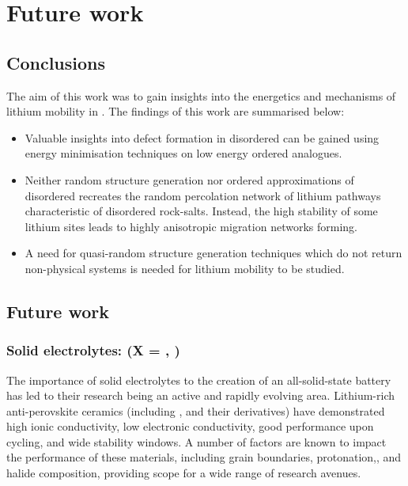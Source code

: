 \chapter{Future work} %

\section{Conclusions}
The aim of this work was to gain insights into the energetics and mechanisms of lithium mobility in .
The findings of this work are summarised below:

\begin{itemize}
	\item Valuable insights into defect formation in disordered  can be gained using energy minimisation techniques on low energy ordered analogues.
	\item Neither random structure generation nor ordered approximations of disordered  recreates the random percolation network of lithium pathways characteristic of disordered rock-salts.
	Instead, the high stability of some lithium sites leads to highly anisotropic migration networks forming.
	\item A need for quasi-random structure generation techniques which do not return non-physical systems is needed for  lithium mobility to be studied.
\end{itemize}
\section{Future work}

\subsection{Solid electrolytes:  (X = , )}
The importance of solid electrolytes to the creation of an all-solid-state battery has led to their research being an active and rapidly evolving area.
Lithium-rich anti-perovskite ceramics (including ,  and their derivatives)\cite{Zhao2012} have demonstrated high ionic conductivity, low electronic conductivity, good performance upon cycling, and wide stability windows.
A number of factors are known to impact the performance of these materials, including grain boundaries,\cite{Dawson2018} protonation,\cite{Dawson2018a}, and halide composition,\cite{Dawson2018b} providing scope for a wide range of research avenues.

